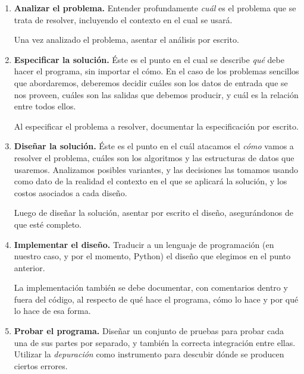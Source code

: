 \begin{enumerate}
\item {\bf Analizar el problema.} Entender profundamente \emph{cuál} es
el problema que se trata de resolver, incluyendo el contexto en el
cual se usará.

\begin{observacion}
Una vez analizado el problema, asentar el análisis por escrito.
\end{observacion}

\item {\bf Especificar la solución.} Éste es el punto en el cual
se describe \emph{qué} debe hacer el programa, sin importar
el cómo. En el caso de los problemas sencillos que abordaremos,
deberemos decidir cuáles son los datos de entrada que se nos
proveen, cuáles son las salidas que debemos producir, y cuál es la
relación entre todos ellos.

\begin{observacion}
Al especificar el problema a resolver, documentar la especificación por
escrito.
\end{observacion}

\item {\bf Diseñar la solución.} Éste es el punto en el cuál
atacamos el \emph{cómo} vamos a resolver el problema, cuáles son
los algoritmos y las estructuras de datos que usaremos. Analizamos
posibles variantes, y las decisiones las tomamos usando como dato
de la realidad el contexto en el que se aplicará la solución, y
los costos asociados a cada diseño.

\begin{observacion}
Luego de diseñar la solución, asentar por escrito el diseño, asegurándonos de
que esté completo.
\end{observacion}

\item {\bf Implementar el diseño.} Traducir a un lenguaje de
programación (en nuestro caso, y por el momento, Python) el diseño
que elegimos en el punto anterior.

\begin{observacion}
La implementación también se debe documentar, con comentarios
dentro y fuera del código, al respecto de qué hace el programa, cómo lo hace y
por qué lo hace de esa forma.
\end{observacion}

\item {\bf Probar el programa.} Diseñar un conjunto de pruebas
para probar cada una de sus partes por separado, y también la
correcta integración entre ellas. Utilizar la \emph{depuración} como
instrumento para descubir dónde se producen ciertos errores.


\end{enumerate}
